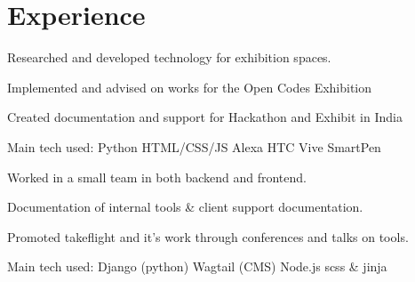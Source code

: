 \documentclass[a4paper]{deedy-resume} %
\begin{document}
\hfill
%
%
\begin{minipage}[t]{0.66\textwidth} %


\section{Experience}


\vspace{\topsep} %
\begin{tightitemize}
\item Researched and developed technology for exhibition spaces.
\item Implemented and advised on works for the Open Codes Exhibition
\item Created documentation and support for Hackathon and Exhibit in India
\end{tightitemize}
Main tech used: \textbullet{} Python \textbullet{} HTML/CSS/JS \textbullet{} Alexa \textbullet{} HTC Vive \textbullet{} SmartPen \textbullet{}

\sectionspace %



\begin{tightitemize}
\item Worked in a small team in both backend and frontend.
\item Documentation of internal tools \& client support documentation.
\item Promoted takeflight and it's work through conferences and talks on tools.
\end{tightitemize}
Main tech used: \textbullet{} Django (python) \textbullet{} Wagtail (CMS) \textbullet{} Node.js \textbullet{} scss \& jinja


\end{minipage}
\end{document}
